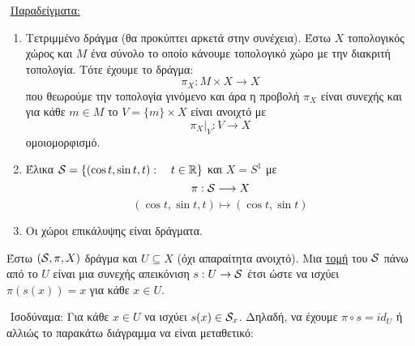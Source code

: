 $ $\newline
\underline{Παραδείγματα:}

\begin{enumerate}
    \item Τετριμμένο δράγμα (θα προκύπτει αρκετά στην συνέχεια). Έστω $X$ τοπολογικός χώρος και $M$ ένα σύνολο το οποίο κάνουμε τοπολογικό χώρο με την διακριτή τοπολογία. Τότε έχουμε το δράγμα:
    $$\pi_X : M\times X \longrightarrow X$$ που θεωρούμε την τοπολογία γινόμενο και άρα η προβολή $\pi_X$ είναι συνεχής και για κάθε $m \in M$ το $V = \{m\} \times X$ είναι ανοιχτό με 
    $$\pi_X|_V : V \longrightarrow X $$ ομοιομορφισμό.

    \item Έλικα $\mathcal{S} = \{(\cos t, \sin t, t): \quad t \in \mathbb{R}\}$ και $X = S^1$ με 
    $$\pi : \mathcal{S} \longrightarrow X$$
    $$(\cos t,\sin t, t) \longmapsto (\cos t, \sin t)$$

    \item Οι χώροι επικάλυψης είναι δράγματα.
\end{enumerate}

\begin{defn} Έστω $(\mathcal{S}, \pi, X)$ δράγμα και $U\subseteq X$ (όχι απαραίτητα ανοιχτό). Μια \underline{τομή} του $\mathcal{S}$ πάνω από το $U$ είναι μια συνεχής απεικόνιση $s : U \rightarrow \mathcal{S}$ έτσι ώστε να ισχύει $\pi(s(x)) = x$ για κάθε $x \in U$.
\end{defn}

$ $\newline
Ισοδύναμα: Για κάθε $x \in U$ να ισχύει $s(x) \in \mathcal{S}_x$. Δηλαδή, να έχουμε $\pi \circ s = id_U$ ή αλλιώς το παρακάτω διάγραμμα να είναι μεταθετικό:

\begin{figure}[H]
    \centering
{}
\end{figure}

